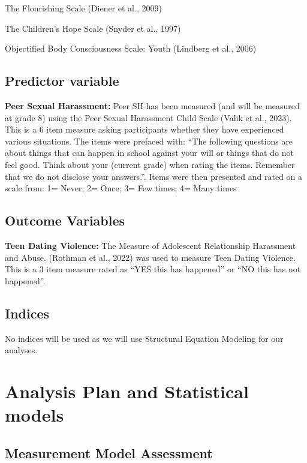 \documentclass[
]{article}
\begin{document}
The Flourishing Scale (Diener et al., 2009)

The Children's Hope Scale (Snyder et al., 1997)

Objectified Body Consciousness Scale: Youth (Lindberg et al., 2006)

\subsection{Predictor variable}\label{predictor-variable}

\textbf{Peer Sexual Harassment:} Peer SH has been measured (and will be
measured at grade 8) using the Peer Sexual Harassment Child Scale (Valik
et al., 2023). This is a 6 item measure asking participants whether they
have experienced various situations. The items were prefaced with: ``The
following questions are about things that can happen in school against
your will or things that do not feel good. Think about your (current
grade) when rating the items. Remember that we do not disclose your
answers.''. Items were then presented and rated on a scale from: 1=
Never; 2= Once; 3= Few times; 4= Many times

\subsection{Outcome Variables}\label{outcome-variables}

\textbf{Teen Dating Violence:} The Measure of Adolescent Relationship
Harassment and Abuse. (Rothman et al., 2022) was used to measure Teen
Dating Violence. This is a 3 item measure rated as ``YES this has
happened'' or ``NO this has not happened''.

\subsection{Indices}\label{indices}

No indices will be used as we will use Structural Equation Modeling for
our analyses.

\section{Analysis Plan and Statistical
models}\label{analysis-plan-and-statistical-models}

\subsection{Measurement Model
Assessment}\label{measurement-model-assessment}
\end{document}
